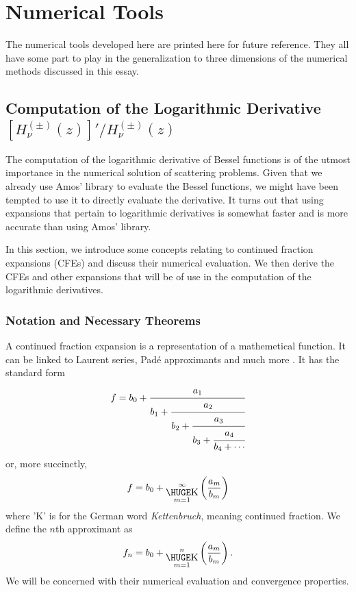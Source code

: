 \chapter{Numerical Tools}
The numerical tools developed here are printed here 
for future reference. They all have some part to play 
in the generalization to three dimensions 
of the numerical methods discussed in this essay. 


\section{Computation of the Logarithmic Derivative $[H^{(\pm)}_\nu(z)]'/H^{(\pm)}_\nu(z)$}\label{sec:app.numTools.logDeriv}

The computation of the logarithmic derivative
of Bessel functions is of the utmost importance in the numerical solution 
of scattering problems. Given that we already use Amos' library \cite{AMO86} to evaluate
the Bessel functions, we might have been tempted to use it 
to directly evaluate the derivative. It turns out that using
expansions that pertain to logarithmic derivatives is somewhat
faster and is more accurate than using Amos' library. 

In this section, we introduce some concepts relating to 
continued fraction expansions (CFEs) and discuss their numerical
evaluation. We then derive the CFEs and other expansions that will
be of use in the computation of the logarithmic derivatives.

\subsection{Notation and Necessary Theorems}
A continued fraction expansion is a representation
of a mathemetical function. It can be linked to 
Laurent series, Padé approximants and much more 
\cite{CUY2008}. It has the standard form 
  \begin{equation}
    f = b_0+\cfrac{a_1}{b_1+\cfrac{a_2}{b_2+\cfrac{a_3}{b_3+\cfrac{a_4}{b_4+\cdots}}}}
  \end{equation}
or, more succinctly, 
  \begin{equation}
   f = b_0 + \bigk_{m=1}^\infty\left(\frac{a_m}{b_m}\right)
  \end{equation}
where 'K' is for the German word \textit{Kettenbruch}, meaning continued fraction.
We define the $n$th approximant as
  \begin{equation}
   f_n = b_0 + \bigk_{m=1}^n\left(\frac{a_m}{b_m}\right).
  \end{equation}
We will be concerned with their numerical evaluation and convergence properties.

